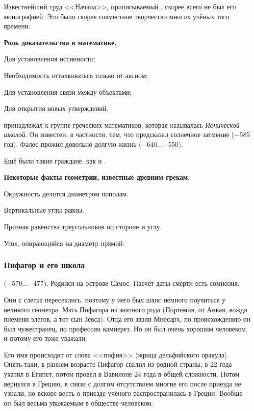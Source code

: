 \documentclass[a4paper,oneside,fleqn,10pt]{article}
\newcommand{\pe}[2]{${#1}\ldots{#2}$}
\begin{document}
Известнейший труд <<Начала>>, приписываемый , скорее всего не
был его монографией. Это было скорее совместное творчество многих учёных
того времени.

\textbf{Роль доказательства в математике.}

\begin{items}{-2}
\item Для установления истинности;
\item Необходимость отталкиваться только от аксиом;
\item Для установления связи между объектами;
\item Для открытия новых утверждений.
\end{items}

 принадлежал к группе греческих математиков, которая называлась \emph{Ионической школой}.
Он известен, в частности, тем, что предсказал солнечное затмение ($-585$ год). Фалес прожил довольно долгую
жизнь (\pe{-640}{-550}).

Ещё были такие граждане, как  и .

\textbf{Некоторые факты геометрии, известные древним грекам.}

\begin{items}{-2}
\item Окружность делится диаметром пополам.
\item Вертикальные углы равны.
\item Признак равенства треугольников по стороне и углу.
\item Угол, опирающийся на диаметр прямой.
\end{items}

\subsubsection{Пифагор и его школа}

 (\pe{-570}{-477}). Родился на острове Самос.
Насчёт даты смерти есть сомнения.

Они с  слегка пересеклись, поэтому у него был шанс немного поучиться у великого геометра.
Мать Пифагора из знатного рода (Портемия, от Анкая, вождя племени элегов, а тот сын Зевса).
Отца его звали Мнесарх, по происхождению он был чужестранец, по профессии камнерез.
Но он был очень хорошим человеком, и потому его тоже уважали.

Его имя происходит от слова <<пифия>> (жрица дельфийского оракула). Опять-таки, в раннем возрасте
Пифагор свалил из родной страны, в 22 года укатил в Египет, потом провёл в Вавилоне 24 года в
общей сложности. Потом вернулся в Грецию, в связи с долгим отсутствием
многие его после приезда не узнали, но вскоре весть о приезде учёного распространилась
в Греции. Вообще он был весьма уважаемым в обществе человеком.
\end{document}
